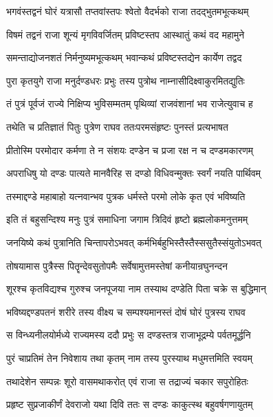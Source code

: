 
\twolineshloka
{भगवंस्तद्वनं घोरं यत्रासौ तप्तवांस्तपः}
{श्वेतो वैदर्भको राजा तदद्भुतमभूत्कथम्}%

\twolineshloka
{विषमं तद्वनं राजा शून्यं मृगविवर्जितम्}
{प्रविष्टस्तप आस्थातुं कथं वद महामुने}%

\twolineshloka
{समन्ताद्योजनशतं निर्मनुष्यमभूत्कथम्}
{भवान्कथं प्रविष्टस्तद्येन कार्येण तद्वद}%


\twolineshloka
{पुरा कृतयुगे राजा मनुर्दण्डधरः प्रभुः}
{तस्य पुत्रोथ नाम्नासीदिक्ष्वाकुरमितद्युतिः}%

\twolineshloka
{तं पुत्रं पूर्वजं राज्ये निक्षिप्य भुविसम्मतम्}
{पृथिव्यां राजवंशानां भव राजेत्युवाच ह}%

\twolineshloka
{तथेति च प्रतिज्ञातं पितुः पुत्रेण राघव}
{ततःपरमसंहृष्टः पुनस्तं प्रत्यभाषत}%

\twolineshloka
{प्रीतोस्मि परमोदार कर्मणा ते न संशयः}
{दण्डेन च प्रजा रक्ष न च दण्डमकारणम्}%

\twolineshloka
{अपराधिषु यो दण्डः पात्यते मानवैरिह}
{स दण्डो विधिवन्मुक्तः स्वर्गं नयति पार्थिवम्}%

\twolineshloka
{तस्माद्दण्डे महाबाहो यत्नवान्भव पुत्रक}
{धर्मस्ते परमो लोके कृत एवं भविष्यति}%

\twolineshloka
{इति तं बहुसन्दिश्य मनुः पुत्रं समाधिना}
{जगाम त्रिदिवं हृष्टो ब्रह्मलोकमनुत्तमम्}%

\twolineshloka
{जनयिष्ये कथं पुत्रानिति चिन्तापरोऽभवत्}
{कर्मभिर्बहुभिस्तैस्तैस्ससुतैस्संयुतोऽभवत्}%

\twolineshloka
{तोषयामास पुत्रैस्स पितॄन्देवसुतोपमैः}
{सर्वेषामुत्तमस्तेषां कनीयान्रघुनन्दन}%

\twolineshloka
{शूरश्च कृतविद्यश्च गुरुश्च जनपूजया}
{नाम तस्याथ दण्डेति पिता चक्रे स बुद्धिमान्}%

\twolineshloka
{भविष्यद्दण्डपतनं शरीरे तस्य वीक्ष्य च}
{सम्पश्यमानस्तं दोषं घोरं पुत्रस्य राघव}%

\twolineshloka
{स विन्ध्यनीलयोर्मध्ये राज्यमस्य ददौ प्रभुः}
{स दण्डस्तत्र राजाभूद्रम्ये पर्वतमूर्द्धनि}%

\twolineshloka
{पुरं चाप्रतिमं तेन निवेशाय तथा कृतम्}
{नाम तस्य पुरस्याथ मधुमत्तमिति स्वयम्}%

\twolineshloka
{तथादेशेन सम्पन्नः शूरो वासमथाकरोत्}
{एवं राजा स तद्राज्यं चकार सपुरोहितः}%

\twolineshloka
{प्रहृष्ट सुप्रजाकीर्णं देवराजो यथा दिवि}
{ततः स दण्डः काकुत्स्थ बहुवर्षगणायुतम्}%

